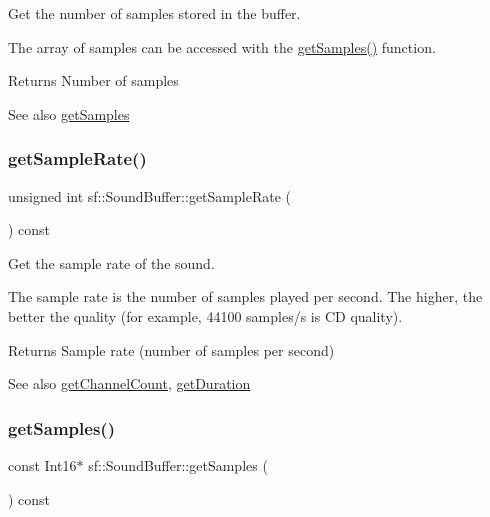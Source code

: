Get the number of samples stored in the buffer. 

The array of samples can be accessed with the \hyperlink{classsf_1_1_sound_buffer_ab9b2525a8da64cb266ba728aff7adecb}{get\+Samples()} function.

\begin{DoxyReturn}{Returns}
Number of samples
\end{DoxyReturn}
\begin{DoxySeeAlso}{See also}
\hyperlink{classsf_1_1_sound_buffer_ab9b2525a8da64cb266ba728aff7adecb}{get\+Samples} 
\end{DoxySeeAlso}
\mbox{\label{classsf_1_1_sound_buffer_a2c2cf0078ce0549246ecc4a1646212b4}} 
\subsubsection{\texorpdfstring{get\+Sample\+Rate()}{getSampleRate()}}
{\footnotesize\ttfamily unsigned int sf\+::\+Sound\+Buffer\+::get\+Sample\+Rate (\begin{DoxyParamCaption}{ }\end{DoxyParamCaption}) const}



Get the sample rate of the sound. 

The sample rate is the number of samples played per second. The higher, the better the quality (for example, 44100 samples/s is CD quality).

\begin{DoxyReturn}{Returns}
Sample rate (number of samples per second)
\end{DoxyReturn}
\begin{DoxySeeAlso}{See also}
\hyperlink{classsf_1_1_sound_buffer_a127707b831d875ed790eef1aa2b9fcc3}{get\+Channel\+Count}, \hyperlink{classsf_1_1_sound_buffer_a280a581d9b360fd16121714c51fc8261}{get\+Duration} 
\end{DoxySeeAlso}
\mbox{\label{classsf_1_1_sound_buffer_ab9b2525a8da64cb266ba728aff7adecb}} 
\subsubsection{\texorpdfstring{get\+Samples()}{getSamples()}}
{\footnotesize\ttfamily const Int16$\ast$ sf\+::\+Sound\+Buffer\+::get\+Samples (\begin{DoxyParamCaption}{ }\end{DoxyParamCaption}) const}



